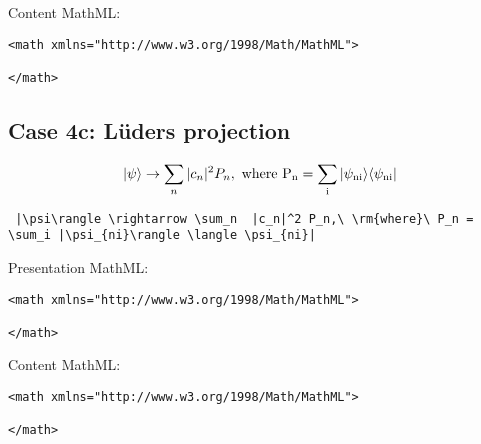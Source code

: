 Content MathML:
\begin{verbatim}
<math xmlns="http://www.w3.org/1998/Math/MathML">

</math>
\end{verbatim}

\subsection{Case 4c: L\"{u}ders projection}
\begin{equation}
 |\psi\rangle \rightarrow \sum_n  |c_n|^2 P_n,\ \rm{where}\ P_n = 
 \sum_i |\psi_{ni}\rangle \langle \psi_{ni}|
\label{eq:Luders_projection_case4c}
\end{equation}

\begin{verbatim}
 |\psi\rangle \rightarrow \sum_n  |c_n|^2 P_n,\ \rm{where}\ P_n = \sum_i |\psi_{ni}\rangle \langle \psi_{ni}|
\end{verbatim}

Presentation MathML:
\begin{verbatim}
<math xmlns="http://www.w3.org/1998/Math/MathML">

</math>
\end{verbatim}

Content MathML:
\begin{verbatim}
<math xmlns="http://www.w3.org/1998/Math/MathML">

</math>
\end{verbatim}
